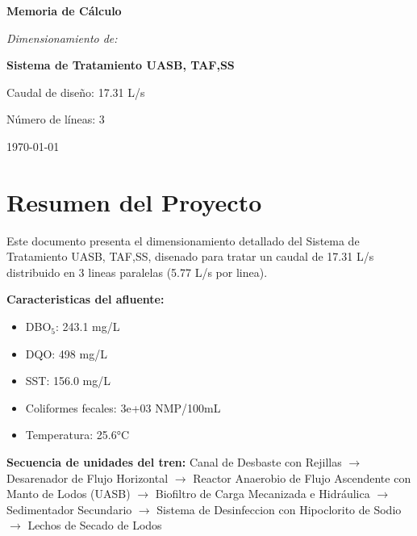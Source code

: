 \documentclass[12pt,a4paper]{article}
\begin{document}
\begin{titlepage}
\centering
\vspace*{2cm}

{\Huge\bfseries Memoria de Cálculo\par}
\vspace{1.5cm}

{\Large\itshape Dimensionamiento de:\par}
\vspace{0.5cm}

{\LARGE\bfseries Sistema de Tratamiento UASB, TAF,SS\par}
\vspace{2cm}

{\large Caudal de diseño: 17.31 L/s\par}
{\large Número de líneas: 3\par}
\vfill
{\large\today\par}
\end{titlepage}

\tableofcontents

\listoffigures

\listoftables

\newpage
\section{Resumen del Proyecto}

Este documento presenta el dimensionamiento detallado del Sistema de Tratamiento UASB, TAF,SS, disenado para tratar un caudal de 17.31 L/s distribuido en 3 lineas paralelas (5.77 L/s por linea).

\textbf{Caracteristicas del afluente:}
\begin{itemize}
    \item DBO$_5$: 243.1 mg/L
    \item DQO: 498 mg/L
    \item SST: 156.0 mg/L
    \item Coliformes fecales: 3e+03 NMP/100mL
    \item Temperatura: 25.6°C
\end{itemize}

\textbf{Secuencia de unidades del tren:} 
Canal de Desbaste con Rejillas $\rightarrow$ Desarenador de Flujo Horizontal $\rightarrow$ Reactor Anaerobio de Flujo Ascendente con Manto de Lodos (UASB) $\rightarrow$ Biofiltro de Carga Mecanizada e Hidráulica $\rightarrow$ Sedimentador Secundario $\rightarrow$ Sistema de Desinfeccion con Hipoclorito de Sodio $\rightarrow$ Lechos de Secado de Lodos
\end{document}
